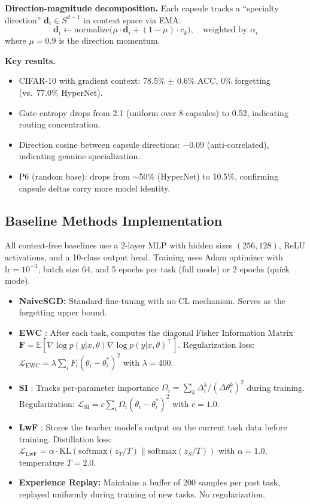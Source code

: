 \documentclass{article}
\begin{document}
\textbf{Direction-magnitude decomposition.}
Each capsule tracks a ``specialty direction'' $\mathbf{d}_i \in S^{d-1}$ in context space via EMA:
\begin{equation}
    \mathbf{d}_i \leftarrow \mathrm{normalize}\bigl(\mu \cdot \mathbf{d}_i + (1 - \mu) \cdot c_k\bigr), \quad \text{weighted by } \alpha_i
\end{equation}
where $\mu = 0.9$ is the direction momentum.

\textbf{Key results.}
\begin{itemize}
    \item CIFAR-10 with gradient context: 78.5\% $\pm$ 0.6\% ACC, 0\% forgetting (vs.\ 77.0\% HyperNet).
    \item Gate entropy drops from 2.1 (uniform over 8 capsules) to 0.52, indicating routing concentration.
    \item Direction cosine between capsule directions: $-0.09$ (anti-correlated), indicating genuine specialization.
    \item P6 (random base): drops from $\sim$50\% (HyperNet) to 10.5\%, confirming capsule deltas carry more model identity.
\end{itemize}


\subsection{Baseline Methods Implementation}
\label{app:baselines}

All context-free baselines use a 2-layer MLP with hidden sizes $(256, 128)$, ReLU activations, and a 10-class output head. Training uses Adam optimizer with $\mathrm{lr} = 10^{-3}$, batch size 64, and 5 epochs per task (full mode) or 2 epochs (quick mode).

\begin{itemize}
    \item \textbf{NaiveSGD:} Standard fine-tuning with no CL mechanism. Serves as the forgetting upper bound.
    \item \textbf{EWC} \citep{kirkpatrick2017overcoming}: After each task, computes the diagonal Fisher Information Matrix $\mathbf{F} = \mathbb{E}[\nabla \log p(y|x,\theta) \nabla \log p(y|x,\theta)^\top]$. Regularization loss: $\mathcal{L}_\mathrm{EWC} = \lambda \sum_i F_i (\theta_i - \theta_i^*)^2$ with $\lambda = 400$.
    \item \textbf{SI} \citep{zenke2017continual}: Tracks per-parameter importance $\Omega_i = \sum_k \Delta_i^k / (\Delta\theta_i^k)^2$ during training. Regularization: $\mathcal{L}_\mathrm{SI} = c \sum_i \Omega_i (\theta_i - \theta_i^*)^2$ with $c = 1.0$.
    \item \textbf{LwF} \citep{li2017learning}: Stores the teacher model's output on the current task data before training. Distillation loss: $\mathcal{L}_\mathrm{LwF} = \alpha \cdot \mathrm{KL}(\mathrm{softmax}(z_T/T) \| \mathrm{softmax}(z_S/T))$ with $\alpha = 1.0$, temperature $T = 2.0$.
    \item \textbf{Experience Replay:} Maintains a buffer of 200 samples per past task, replayed uniformly during training of new tasks. No regularization.
\end{itemize}
\end{document}
